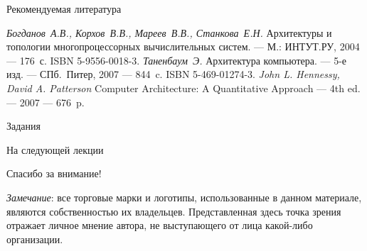 \begin{frame}[allowframebreaks]{Рекомендуемая литература}
\begin{thebibliography}{99}
    \bibitem{} \textit{Богданов~А.В., Корхов~В.В., Мареев~В.В., Станкова~Е.Н.}
    Архитектуры и топологии многопроцессорных вычислительных систем. --- М.:
    ИНТУТ.РУ, 2004 --- 176~с. ISBN 5-9556-0018-3.
    \bibitem{} \textit{Таненбаум~Э.} Архитектура компьютера. --- 5-е изд. ---
    СПб.~Питер, 2007 --- 844~c. ISBN 5-469-01274-3.
    \bibitem{} \textit{John L. Hennessy, David A. Patterson} Computer
    Architecture: A Quantitative Approach --- 4th ed. --- 2007 --- 676~p.
\end{thebibliography}
\end{frame}

\begin{frame}{Задания}
\end{frame}

\begin{frame}{На следующей лекции}
\end{frame}

\begin{frame}

{\huge{Спасибо за внимание!}\par}

\vfill

\tiny{\textit{Замечание}: все торговые марки и логотипы, использованные в данном материале, являются собственностью их владельцев. Представленная здесь точка зрения отражает личное мнение автора, не выступающего от лица какой-либо организации.}

\end{frame}



